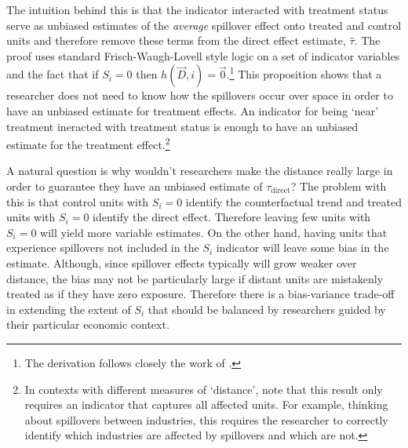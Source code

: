 \documentclass[11pt]{article}
\begin{document}
The intuition behind this is that the indicator interacted with treatment status serve as unbiased estimates of the \textit{average} spillover effect onto treated and control units and therefore remove these terms from the direct effect estimate, $\hat{\tau}$. The proof uses standard Frisch-Waugh-Lovell style logic on a set of indicator variables and the fact that if $S_{i} = 0$ then $h(\vec{D}, i) = \vec{0}$.\footnote{The derivation follows closely the work of \citet{Clarke_2019}.} This proposition shows that a researcher does not need to know how the spillovers occur over space in order to have an unbiased estimate for treatment effects. An indicator for being `near' treatment ineracted with treatment status is enough to have an unbiased estimate for the treatment effect.\footnote{In contexts with different measures of `distance', note that this result only requires an indicator that captures all affected units. For example, thinking about spillovers between industries, this requires the researcher to correctly identify which industries are affected by spillovers and which are not.} 

A natural question is why wouldn't researchers make the distance really large in order to guarantee they have an unbiased estimate of $\tau_{\text{direct}}$? The problem with this is that control units with $S_i = 0$ identify the counterfactual trend and treated units with $S_i = 0$ identify the direct effect. Therefore leaving few units with $S_i = 0$ will yield more variable estimates. On the other hand, having units that experience spillovers not included in the $S_i$ indicator will leave some bias in the estimate. Although, since spillover effects typically will grow weaker over distance, the bias may not be particularly large if distant units are mistakenly treated as if they have zero exposure. Therefore there is a bias-variance trade-off in extending the extent of $S_i$ that should be balanced by researchers guided by their particular economic context.
\end{document}
